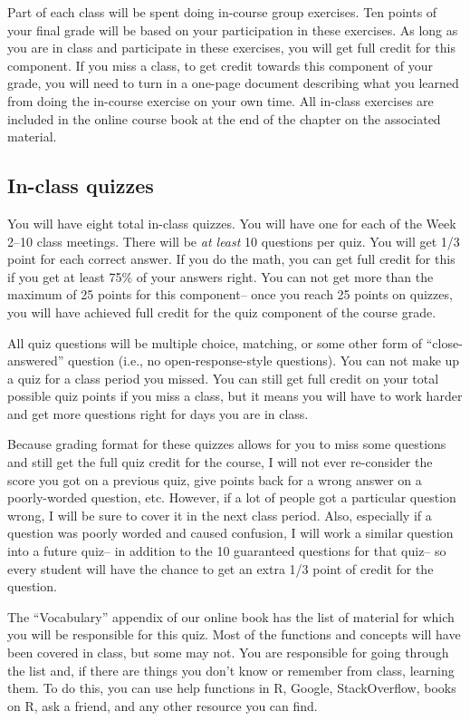 \documentclass[]{book}
\theoremstyle{definition}
\theoremstyle{definition}
\theoremstyle{definition}
\theoremstyle{remark}
\begin{document}
Part of each class will be spent doing in-course group exercises. Ten
points of your final grade will be based on your participation in these
exercises. As long as you are in class and participate in these
exercises, you will get full credit for this component. If you miss a
class, to get credit towards this component of your grade, you will need
to turn in a one-page document describing what you learned from doing
the in-course exercise on your own time. All in-class exercises are
included in the online course book at the end of the chapter on the
associated material.

\subsection{In-class quizzes}\label{in-class-quizzes}

You will have eight total in-class quizzes. You will have one for each
of the Week 2--10 class meetings. There will be \emph{at least} 10
questions per quiz. You will get 1/3 point for each correct answer. If
you do the math, you can get full credit for this if you get at least
75\% of your answers right. You can not get more than the maximum of 25
points for this component-- once you reach 25 points on quizzes, you
will have achieved full credit for the quiz component of the course
grade.

All quiz questions will be multiple choice, matching, or some other form
of ``close-answered'' question (i.e., no open-response-style questions).
You can not make up a quiz for a class period you missed. You can still
get full credit on your total possible quiz points if you miss a class,
but it means you will have to work harder and get more questions right
for days you are in class.

Because grading format for these quizzes allows for you to miss some
questions and still get the full quiz credit for the course, I will not
ever re-consider the score you got on a previous quiz, give points back
for a wrong answer on a poorly-worded question, etc. However, if a lot
of people got a particular question wrong, I will be sure to cover it in
the next class period. Also, especially if a question was poorly worded
and caused confusion, I will work a similar question into a future
quiz-- in addition to the 10 guaranteed questions for that quiz-- so
every student will have the chance to get an extra 1/3 point of credit
for the question.

The ``Vocabulary'' appendix of our online book has the list of material
for which you will be responsible for this quiz. Most of the functions
and concepts will have been covered in class, but some may not. You are
responsible for going through the list and, if there are things you
don't know or remember from class, learning them. To do this, you can
use help functions in R, Google, StackOverflow, books on R, ask a
friend, and any other resource you can find.
\end{document}
